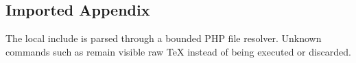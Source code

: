\subsection{Imported Appendix}\label{sec:appendix}
The local include is parsed through a bounded PHP file resolver. Unknown
commands such as  remain visible raw TeX instead of
being executed or discarded.
